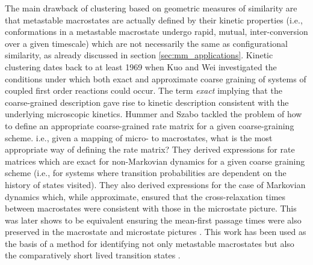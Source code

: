 The main drawback of clustering based on geometric measures of similarity are that metastable macrostates are actually defined by their kinetic properties (i.e., conformations in a metastable macrostate undergo rapid, mutual, inter-conversion over a given timescale) which are not necessarily the same \cite{schutteDirectApproachConformational1999} as configurational similarity, as already discussed in section \ref{sec:mm_applications}. Kinetic clustering dates back to at least 1969 when Kuo and Wei \cite{weiLumpingAnalysisMonomolecular1969, kuoLumpingAnalysisMonomolecular} investigated the conditions under which both exact and approximate coarse graining of systems of coupled first order reactions could occur. The term \emph{exact} implying that the coarse-grained description gave rise to kinetic description consistent with the underlying microscopic kinetics.  Hummer and Szabo \cite{hummerOptimalDimensionalityReduction2015a} tackled the problem of how to define an appropriate coarse-grained rate matrix for a given coarse-graining scheme. i.e., given a mapping of micro- to macrostates, what is the most appropriate way of defining the rate matrix?  They derived expressions for rate matrices which are exact for non-Markovian dynamics  for a given coarse graining scheme (i.e., for systems where transition probabilities are dependent on the history of states visited). They also derived expressions for the case of Markovian dynamics which, while approximate, ensured that the cross-relaxation times between macrostates were consistent with those in the microstate picture. This was later shows to be equivalent ensuring the mean-first passage times were also preserved in the macrostate and microstate pictures \cite{kellsCorrelationFunctionsMean2020}. This work has been used as the basis of a method for identifying not only metastable macrostates but also the comparatively short lived transition states \cite{martiniVariationalIdentificationMarkovian2017}. 

